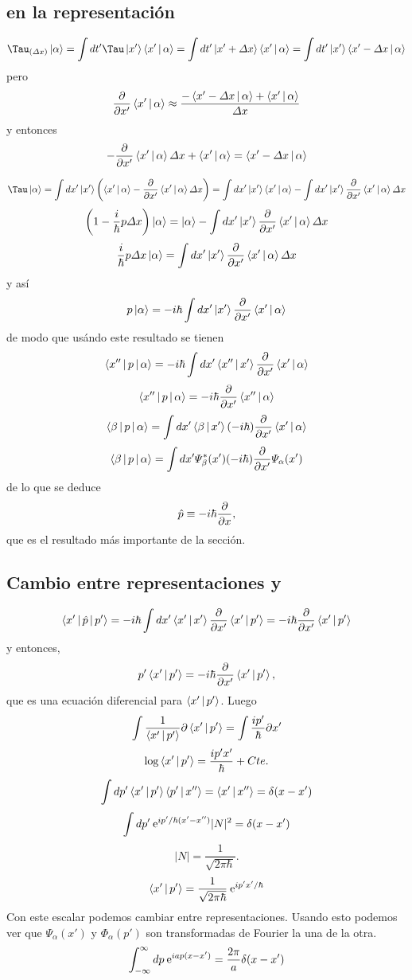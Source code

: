 \documentclass[10pt,oneside]{CBFT_book}
\begin{document}
\subsection{ en la representación }

\[
	\Tau_{(\Delta x)} \Ket{\alpha} = \int dt' \Tau\Ket{x'}\Braket{x'|\alpha} = 
		\int dt' \Ket{x'+ \Delta x}\Braket{x'|\alpha} = \int dt' \Ket{x'}\Braket{x'-\Delta x|\alpha}
\]
pero
\[
	\frac{\partial^{\hspace{-0.05em}} {}}{\partial {x'}^{\hspace{-0.05em}}} \Braket{x'|\alpha} \approx \frac{ -\Braket{x'-\Delta x|\alpha} + \Braket{x'|\alpha} }{\Delta x}
\]
y entonces
\[
	-\frac{\partial^{\hspace{-0.05em}} {}}{\partial {x'}^{\hspace{-0.05em}}} \Braket{x'|\alpha} \Delta x + \Braket{x'|\alpha}  = \Braket{x'-\Delta x|\alpha}
\]

\[
	\Tau\Ket{\alpha} = \int dx' \Ket{x'}\left( \Braket{x'|\alpha} -\dpar{}{x'} \Braket{x'|\alpha} \Delta x \right) =
	\int dx' \Ket{x'} \Braket{x'|\alpha} - \int dx' \Ket{x'}  \dpar{}{x'} \Braket{x'|\alpha} \Delta x 
\]
\[
	\left( 1 - \frac{i}{\hbar}p\Delta x \right) \Ket{\alpha} = 
		\Ket{\alpha} - \int dx' \Ket{x'}  \frac{\partial^{\hspace{-0.05em}} {}}{\partial {x'}^{\hspace{-0.05em}}} \Braket{x'|\alpha} \Delta x
\]
\[
	\frac{i}{\hbar}p\Delta x \Ket{\alpha} = \int dx' \Ket{x'}  \frac{\partial^{\hspace{-0.05em}} {}}{\partial {x'}^{\hspace{-0.05em}}} \Braket{x'|\alpha} \Delta x
\]
y así
\[
	p\Ket{\alpha} = -i\hbar \int dx' \Ket{x'}  \frac{\partial^{\hspace{-0.05em}} {}}{\partial {x'}^{\hspace{-0.05em}}} \Braket{x'|\alpha}
\]
de modo que usándo este resultado se tienen
\[
	\Braket{x''|p|\alpha} = -i\hbar \int dx' \Braket{x''|x'}  \frac{\partial^{\hspace{-0.05em}} {}}{\partial {x'}^{\hspace{-0.05em}}} \Braket{x'|\alpha}
\]
\[
	\Braket{x''|p|\alpha} = -i\hbar \frac{\partial^{\hspace{-0.05em}} {}}{\partial {x'}^{\hspace{-0.05em}}} \Braket{x''|\alpha}
\]
\[
	\Braket{\beta|p|\alpha} = \int dx' \Braket{\beta|x'} (-i\hbar) \frac{\partial^{\hspace{-0.05em}} {}}{\partial {x'}^{\hspace{-0.05em}}} \Braket{x'|\alpha}
\]
\[
	\Braket{\beta|p|\alpha} = \int dx' \Psi_\beta^*(x') (-i\hbar) \frac{\partial^{\hspace{-0.05em}} {}}{\partial {x'}^{\hspace{-0.05em}}} \Psi_\alpha(x')
\]
de lo que se deduce 
\[
	\hat{p} \equiv - i \hbar \frac{\partial^{\hspace{-0.05em}} {}}{\partial {x}^{\hspace{-0.05em}}},
\]
que es el resultado más importante de la sección.

\subsection{Cambio entre representaciones  y  }

\[
	\Braket{x'|\hat{p}|p'} =  -i\hbar \int dx'  \Braket{x'|x'} \frac{\partial^{\hspace{-0.05em}} {}}{\partial {x'}^{\hspace{-0.05em}}} \Braket{x'|p'} =
	-i\hbar \frac{\partial^{\hspace{-0.05em}} {}}{\partial {x'}^{\hspace{-0.05em}}} \Braket{x'|p'}
\]
y entonces,
\[
	p' \Braket{x'|p'} = -i\hbar \frac{\partial^{\hspace{-0.05em}} {}}{\partial {x'}^{\hspace{-0.05em}}} \Braket{x'|p'},
\]
que es una ecuación diferencial para $\Braket{x'|p'}$. Luego
\[
	\int  \frac{1}{\Braket{x'|p'}} \partial \Braket{x'|p'} = 
	\int \frac{ip'}{\hbar} \partial x'
\]
\[
	\log \Braket{x'|p'} = \frac{ip'x'}{\hbar} + Cte.
\]
\[
	\int dp' \Braket{x'|p'} \Braket{p'|x''} = \Braket{x'|x''} = \delta(x-x')
\]
\[
	\int dp' \:\mathrm{e}^{ip'/\hbar(x'-x'')} |N|^2 = \delta(x-x')
\]
\[
	|N| = \frac{1}{\sqrt{2\pi\hbar}}.
\]
\[
	\Braket{x'|p'} = \frac{1}{\sqrt{2\pi\hbar}} \:\mathrm{e}^{i p'x'/\hbar}
\]
Con este escalar podemos cambiar entre representaciones.
Usando esto podemos ver que $\Psi_\alpha(x')$ y $\Phi_\alpha(p')$ son transformadas 
de Fourier la una de la otra.
\[
	 \int_{-\infty}^\infty dp \:\mathrm{e}^{iap(x-x')} = \frac{2\pi}{a}\delta(x-x')
\]
\end{document}
